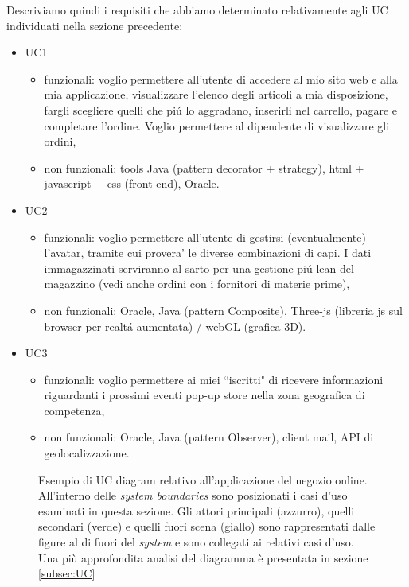 \documentclass[12pt]{article}
\begin{document}
Descriviamo quindi i requisiti che abbiamo determinato relativamente agli UC individuati nella sezione precedente: 
\begin{itemize}
    \item UC1
        \begin{itemize}
        \item funzionali: voglio permettere all'utente di accedere al mio sito web e alla mia applicazione, visualizzare l'elenco degli articoli a mia disposizione, fargli scegliere quelli che pi\'u lo aggradano, inserirli nel carrello, pagare e completare l'ordine. Voglio permettere al dipendente di visualizzare gli ordini, 
        \item non funzionali: tools Java (pattern decorator + strategy), html + javascript + css (front-end), Oracle. 
        \end{itemize}
    \item UC2
        \begin{itemize}
        \item funzionali: voglio permettere all'utente di gestirsi (eventualmente) l'avatar, tramite cui provera' le diverse combinazioni di capi. I dati immagazzinati serviranno al sarto per una gestione pi\'u lean del magazzino (vedi anche ordini con i fornitori di materie prime),
        \item non funzionali: Oracle, Java (pattern Composite), Three-js (libreria js sul browser per realt\'a aumentata) / webGL (grafica 3D).
        \end{itemize}
    \item UC3
        \begin{itemize}
        \item funzionali: voglio permettere ai miei ``iscritti" di ricevere informazioni riguardanti i prossimi eventi pop-up store nella zona geografica di competenza,
        \item non funzionali: Oracle, Java (pattern Observer), client mail, API di geolocalizzazione.
        \end{itemize}
\end{itemize}

\vspace{0.5cm}
\begin{figure}[t]
  \centering
   \makebox[\textwidth][c]{}
   \vspace{0.5cm}
  \caption{\small Esempio di UC diagram relativo all'applicazione del negozio online. All'interno delle {\em system boundaries} sono posizionati i casi d'uso esaminati in questa sezione. Gli attori principali (azzurro), quelli secondari (verde) e quelli fuori scena (giallo) sono rappresentati dalle figure al di fuori del {\em system} e sono collegati ai relativi casi d'uso. Una più approfondita analisi del diagramma è presentata in sezione \ref{subsec:UC}}
  \label{fig:UC_diagram}
\end{figure}
\end{document}

